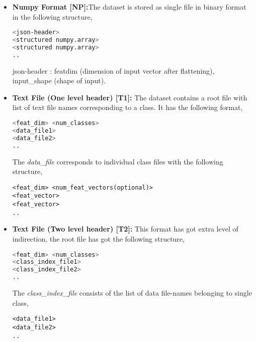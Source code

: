 \begin{itemize}
\item{\textbf {Numpy Format [NP]:}The dataset is stored as single file in binary format in the following structure,
\begin{lstlisting}[language=bash,basicstyle=\small] 
<json-header>
<structured numpy.array>
<structured numpy.array>
..
\end{lstlisting}
json-header  : featdim (dimension of input vector after flattening), input\_shape (shape of input).}

\item{\textbf {Text File (One level header) [T1]:} The dataset contains a root file with list of  text file names corresponding to a class.  It has the following format,
\begin{lstlisting}[language=bash,basicstyle=\small] 
<feat_dim> <num_classes>
<data_file1>
<data_file2>
..
\end{lstlisting}
The \textit{data\_file} corresponds to individual class files with the following structure,
\begin{lstlisting}[basicstyle=\small] 
<feat_dim> <num_feat_vectors(optional)>
<feat_vector>
<feat_vector>
..
\end{lstlisting}}

\item{\textbf {Text File (Two level header) [T2]:} This format has got extra level of indirection, the root file has got the following structure,
\begin{lstlisting}[language=bash,basicstyle=\small] 
<feat_dim> <num_classes>
<class_index_file1>
<class_index_file2>
..
\end{lstlisting}
The \textit{class\_index\_file} consists of the list of data file-names belonging to single class, 
\begin{lstlisting}[basicstyle=\small] 
<data_file1>
<data_file2>
..
\end{lstlisting}}
\end{itemize}

